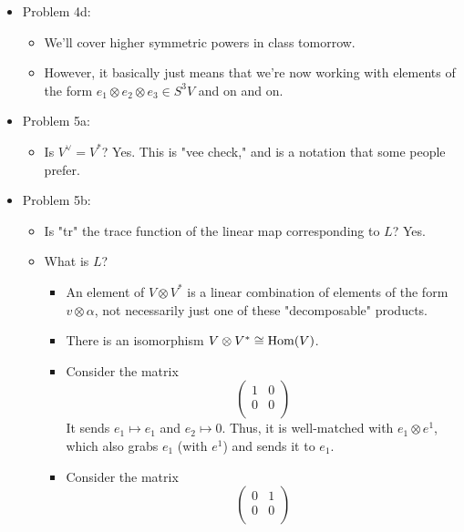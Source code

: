 \documentclass[../notes.tex]{subfiles}
\begin{document}
\begin{itemize}
\begin{itemize}
    \end{itemize}
    \item Problem 4d:
    \begin{itemize}
        \item We'll cover higher symmetric powers in class tomorrow.
        \item However, it basically just means that we're now working with elements of the form $e_1\otimes e_2\otimes e_3\in S^3V$ and on and on.
    \end{itemize}
    \item Problem 5a:
    \begin{itemize}
        \item Is $V^\vee=V^*$? Yes. This is "vee check," and is a notation that some people prefer.
    \end{itemize}
    \item Problem 5b:
    \begin{itemize}
        \item Is "tr" the trace function of the linear map corresponding to $L$? Yes.
        \item What is $L$?
        \begin{itemize}
            \item An element of $V\otimes V^*$ is a linear combination of elements of the form $v\otimes\alpha$, not necessarily just one of these "decomposable" products.
            \item There is an isomorphism $V\otimes V^*\cong\operatorname{Hom}(V)$.
            \item Consider the matrix
            \begin{equation*}
                \begin{pmatrix}
                    1 & 0\\
                    0 & 0\\
                \end{pmatrix}
            \end{equation*}
            It sends $e_1\mapsto e_1$ and $e_2\mapsto 0$. Thus, it is well-matched with $e_1\otimes e^1$, which also grabs $e_1$ (with $e^1$) and sends it to $e_1$.
            \item Consider the matrix
            \begin{equation*}
                \begin{pmatrix}
                    0 & 1\\
                    0 & 0\\
                \end{pmatrix}

\end{equation*}
\end{itemize}
\end{itemize}
\end{itemize}
\end{document}
